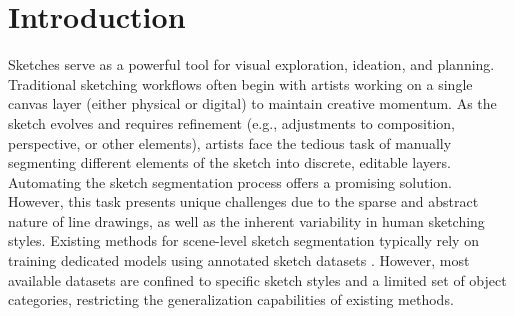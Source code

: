 \section{Introduction}
Sketches serve as a powerful tool for visual exploration, ideation,
and planning. Traditional sketching workflows often begin with artists
working on a single canvas layer (either physical or digital) to
maintain creative momentum. As the sketch evolves and requires
refinement (e.g., adjustments to composition, perspective, or other
elements), artists face the tedious task of manually segmenting
different elements of the sketch into discrete, editable layers.
Automating the sketch segmentation process offers a promising
solution. However, this task presents unique challenges due to the
sparse and abstract nature of line drawings, as well as the inherent
variability in human sketching styles.
Existing methods for scene-level sketch segmentation typically rely on training dedicated models using annotated sketch datasets \cite{sketchydataset, Zou18SketchyScene, fscoco}. 
However, most available datasets are confined to specific sketch styles and a limited set of object categories, restricting the generalization capabilities of existing methods.



